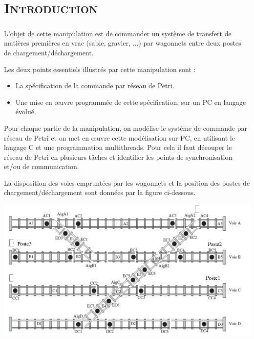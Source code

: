 \chapter*{\textsc{Introduction}}

	\paragraph{} L'objet de cette manipulation est de commander un système de transfert de matières premières en vrac (sable, gravier, ...) par wagonnets entre deux postes de chargement/déchargement.
	\par Les deux points essentiels illustrés par cette manipulation sont :
	
		\begin{itemize} [label=,font=\small \color{black}]
   		\item La spécification de la commande par réseau de Petri.
   		\item Une mise en œuvre programmée de cette spécification, sur un PC en langage évolué.
  		\end{itemize}


\par Pour chaque partie de la manipulation, on modélise le système de commande par réseau de Petri et on met en œuvre cette modélisation sur PC, en utilisant le langage C et une programmation multithreads. Pour cela il faut découper le réseau de Petri en plusieurs tâches et identifier les points
de synchronisation et/ou de communication.

\par La disposition des voies empruntées par les wagonnets et la position des postes de chargement/déchargement sont données par la figure ci-dessous.

	\begin{center}
	\includegraphics[scale=0.4]{maquette.png}
	\label{fig4} 
	\end{center}  




